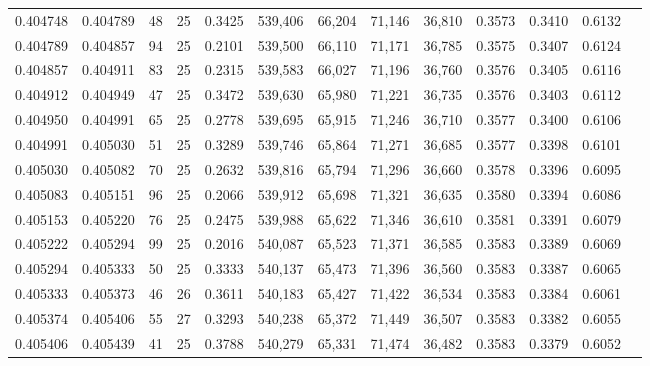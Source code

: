 \begin{tabular}{rrrrrrrrrrrrr}
0.404748 & 0.404789 &    48 &  25 &                                     0.3425 & 539,406 &  66,204 &  71,146 &  36,810 & 0.3573 & 0.3410 & 0.6132 \\
0.404789 & 0.404857 &    94 &  25 &                                     0.2101 & 539,500 &  66,110 &  71,171 &  36,785 & 0.3575 & 0.3407 & 0.6124 \\
0.404857 & 0.404911 &    83 &  25 &                                     0.2315 & 539,583 &  66,027 &  71,196 &  36,760 & 0.3576 & 0.3405 & 0.6116 \\
0.404912 & 0.404949 &    47 &  25 &                                     0.3472 & 539,630 &  65,980 &  71,221 &  36,735 & 0.3576 & 0.3403 & 0.6112 \\
0.404950 & 0.404991 &    65 &  25 &                                     0.2778 & 539,695 &  65,915 &  71,246 &  36,710 & 0.3577 & 0.3400 & 0.6106 \\
0.404991 & 0.405030 &    51 &  25 &                                     0.3289 & 539,746 &  65,864 &  71,271 &  36,685 & 0.3577 & 0.3398 & 0.6101 \\
0.405030 & 0.405082 &    70 &  25 &                                     0.2632 & 539,816 &  65,794 &  71,296 &  36,660 & 0.3578 & 0.3396 & 0.6095 \\
0.405083 & 0.405151 &    96 &  25 &                                     0.2066 & 539,912 &  65,698 &  71,321 &  36,635 & 0.3580 & 0.3394 & 0.6086 \\
0.405153 & 0.405220 &    76 &  25 &                                     0.2475 & 539,988 &  65,622 &  71,346 &  36,610 & 0.3581 & 0.3391 & 0.6079 \\
0.405222 & 0.405294 &    99 &  25 &                                     0.2016 & 540,087 &  65,523 &  71,371 &  36,585 & 0.3583 & 0.3389 & 0.6069 \\
0.405294 & 0.405333 &    50 &  25 &                                     0.3333 & 540,137 &  65,473 &  71,396 &  36,560 & 0.3583 & 0.3387 & 0.6065 \\
0.405333 & 0.405373 &    46 &  26 &                                     0.3611 & 540,183 &  65,427 &  71,422 &  36,534 & 0.3583 & 0.3384 & 0.6061 \\
0.405374 & 0.405406 &    55 &  27 &                                     0.3293 & 540,238 &  65,372 &  71,449 &  36,507 & 0.3583 & 0.3382 & 0.6055 \\
0.405406 & 0.405439 &    41 &  25 &                                     0.3788 & 540,279 &  65,331 &  71,474 &  36,482 & 0.3583 & 0.3379 & 0.6052 \\

\end{tabular}
